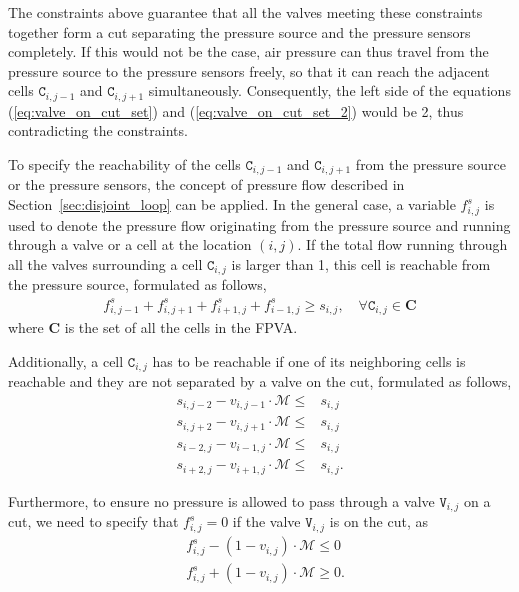 \documentclass[journal,twoside]{IEEEtran}
\begin{document}
The constraints above guarantee that all the valves meeting these constraints
together form a cut separating the pressure source and the pressure sensors
completely. If this would not be the case, 
air pressure can thus travel from the pressure source to the pressure
sensors freely, so that it can reach the adjacent cells
$\mathtt{C}_{i,j-1}$ and $\mathtt{C}_{i,j+1}$
simultaneously. Consequently, the left side of the equations
(\ref{eq:valve_on_cut_set}) and (\ref{eq:valve_on_cut_set_2}) would be 2,
thus contradicting the constraints.

To specify the reachability of the 
cells $\mathtt{C}_{i,j-1}$ and $\mathtt{C}_{i,j+1}$ from the pressure source or
the pressure sensors, 
the concept of pressure flow described in Section~\ref{sec:disjoint_loop} can
be applied.  
In the general case, a 
variable $f^s_{i,j}$ is used to denote the pressure flow
originating from the pressure source and running through a
valve or a cell at the location $(i,j)$. If the total flow running
through all the valves surrounding a cell $\mathtt{C}_{i,j}$ is larger than 1,
this cell is reachable from the pressure source, formulated as
follows,
\begin{align}
\label{eq:flow_on_cell_s}
f^{s}_{i,j-1}+ f^{s}_{i,j+1}+ f^{s}_{i+1,j}+ f^{s}_{i-1,j}
\ge s_{i,j}, \quad \forall \mathtt{C}_{i,j} \in \mathbf{C}
\end{align}
where $\mathbf{C}$ is the set of all the cells in the FPVA.


Additionally, 
a cell $\mathtt{C}_{i,j}$ has to be reachable if one of its
neighboring cells is reachable and they are not separated by a
valve on the cut, formulated as follows,
\begin{align}
\label{eq:must_reach}
s_{i,j-2} - v_{i,j-1}\cdot\mathcal{M} \le &s_{i,j} \\
\label{eq:must_reach_2}
s_{i,j+2} - v_{i,j+1}\cdot\mathcal{M} \le &s_{i,j} \\
\label{eq:must_reach_3}
s_{i-2,j} - v_{i-1,j}\cdot\mathcal{M} \le &s_{i,j} \\
\label{eq:must_reach_4}
s_{i+2,j} - v_{i+1,j}\cdot\mathcal{M} \le &s_{i,j}.
\end{align}

Furthermore,
to ensure no pressure is allowed to pass through a valve
$\mathtt{V}_{i,j}$ on a cut, we need to specify that $f^s_{i,j}=0$
if the valve $\mathtt{V}_{i,j}$ is on the cut, as
\begin{align}
\label{eq:no_flow_cut}
&f^{s}_{i,j} - (1 - v_{i,j})\cdot\mathcal{M} \le 0\\
\label{eq:no_flow_cut_2}
&f^{s}_{i,j} + (1 - v_{i,j})\cdot\mathcal{M} \ge 0.
\end{align}
\end{document}
